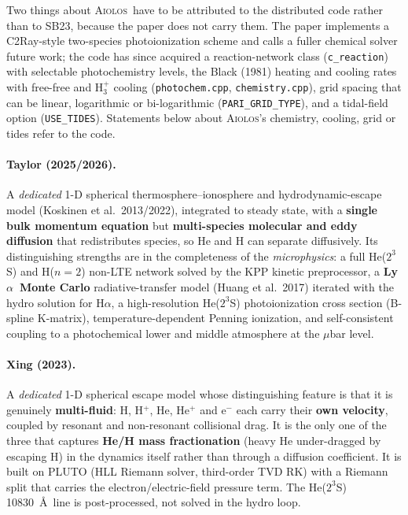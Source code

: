 \documentclass[english,a4paper]{my_memo}
\newcommand{\AIOLOS}{\textsc{Aiolos}}
\newcommand{\Lya}{Ly$\alpha$}
\newcommand{\Ha}{H$\alpha$}
\begin{document}
Two things about \AIOLOS\ have to be attributed to the distributed code rather
than to SB23, because the paper does not carry them. The paper implements a
C2Ray-style two-species photoionization scheme and calls a fuller chemical
solver future work; the code has since acquired a reaction-network class
(\texttt{c\_reaction}) with selectable photochemistry levels, the Black (1981)
heating and cooling rates with free-free and H$_3^+$ cooling
(\texttt{photochem.cpp}, \texttt{chemistry.cpp}), grid spacing that can be
linear, logarithmic or bi-logarithmic (\texttt{PARI\_GRID\_TYPE}), and a
tidal-field option (\texttt{USE\_TIDES}). Statements below about \AIOLOS's
chemistry, cooling, grid or tides refer to the code.

\paragraph{Taylor (2025/2026).} A \emph{dedicated} 1-D spherical
thermosphere--ionosphere and hydrodynamic-escape model (Koskinen et al.\
2013/2022), integrated to steady state, with a \textbf{single bulk momentum
equation} but \textbf{multi-species molecular and eddy diffusion} that
redistributes species, so He and H can separate diffusively. Its distinguishing
strengths are in the completeness of the \emph{microphysics}: a full
He($2^3$S) and H($n{=}2$) non-LTE network solved by the KPP kinetic
preprocessor, a \textbf{\Lya\ Monte Carlo} radiative-transfer model (Huang et
al.\ 2017) iterated with the hydro solution for \Ha, a high-resolution
He($2^3$S) photoionization cross section (B-spline K-matrix),
temperature-dependent Penning ionization, and self-consistent coupling to a
photochemical lower and middle atmosphere at the $\mu$bar level.

\paragraph{Xing (2023).} A \emph{dedicated} 1-D spherical escape model whose
distinguishing feature is that it is genuinely \textbf{multi-fluid}: H, H$^+$,
He, He$^+$ and e$^-$ each carry their \textbf{own velocity}, coupled by
resonant and non-resonant collisional drag. It is the only one of the three
that captures \textbf{He/H mass fractionation} (heavy He under-dragged by
escaping H) in the dynamics itself rather than through a diffusion
coefficient. It is built on PLUTO (HLL Riemann solver, third-order TVD RK) with
a Riemann split that carries the electron/electric-field pressure term. The
He($2^3$S) 10830~\AA\ line is post-processed, not solved in the hydro loop.
\end{document}
